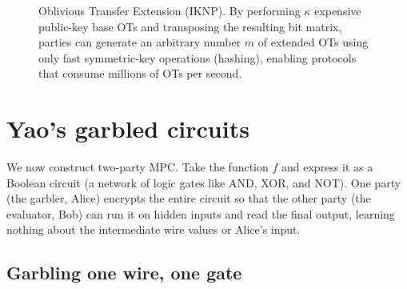 \begin{figure}[H]
\centering
{}
\caption{Oblivious Transfer Extension (IKNP). By performing $\kappa$ expensive public-key base OTs and transposing the resulting bit matrix, parties can generate an arbitrary number $m$ of extended OTs using only fast symmetric-key operations (hashing), enabling protocols that consume millions of OTs per second.}
\label{ch34:fig-ot-extension}
\end{figure}

\section{Yao's garbled circuits}
\label{ch34:garbled}

We now construct two-party MPC. Take the function $f$ and express it as a Boolean circuit (a network of logic gates like AND, XOR, and NOT). One party (the garbler, Alice) encrypts the entire circuit so that the other party (the evaluator, Bob) can run it on hidden inputs and read the final output, learning nothing about the intermediate wire values or Alice's input.

\subsection{Garbling one wire, one gate}

